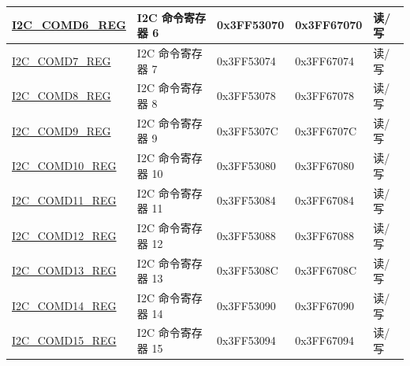 \documentclass[main.tex]{subfiles}
\begin{document}
\begin{longtable}{ | p{5cm} | p{5.3cm} | p{2cm} | p{2cm} | p{1.2cm} | }
\hyperref[regdesc:I2CCOMDnREG]{I2C\_COMD6\_REG} & I2C 命令寄存器 6 & 0x3FF53070 & 0x3FF67070 & 读/写\\ \hline
\hyperref[regdesc:I2CCOMDnREG]{I2C\_COMD7\_REG} & I2C 命令寄存器 7 & 0x3FF53074 & 0x3FF67074 & 读/写\\ \hline
\hyperref[regdesc:I2CCOMDnREG]{I2C\_COMD8\_REG} & I2C 命令寄存器 8 & 0x3FF53078 & 0x3FF67078 & 读/写\\ \hline
\hyperref[regdesc:I2CCOMDnREG]{I2C\_COMD9\_REG} & I2C 命令寄存器 9 & 0x3FF5307C & 0x3FF6707C & 读/写\\ \hline
\hyperref[regdesc:I2CCOMDnREG]{I2C\_COMD10\_REG} & I2C 命令寄存器 10 & 0x3FF53080 & 0x3FF67080 & 读/写\\ \hline
\hyperref[regdesc:I2CCOMDnREG]{I2C\_COMD11\_REG} & I2C 命令寄存器 11 & 0x3FF53084 & 0x3FF67084 & 读/写\\ \hline
\hyperref[regdesc:I2CCOMDnREG]{I2C\_COMD12\_REG} & I2C 命令寄存器 12 & 0x3FF53088 & 0x3FF67088 & 读/写\\ \hline
\hyperref[regdesc:I2CCOMDnREG]{I2C\_COMD13\_REG} & I2C 命令寄存器 13 & 0x3FF5308C & 0x3FF6708C& 读/写\\ \hline
\hyperref[regdesc:I2CCOMDnREG]{I2C\_COMD14\_REG} & I2C 命令寄存器 14 & 0x3FF53090 & 0x3FF67090 & 读/写\\ \hline
\hyperref[regdesc:I2CCOMDnREG]{I2C\_COMD15\_REG} & I2C 命令寄存器 15 & 0x3FF53094 & 0x3FF67094 & 读/写\\ \hline
\end{longtable}
\end{document}
